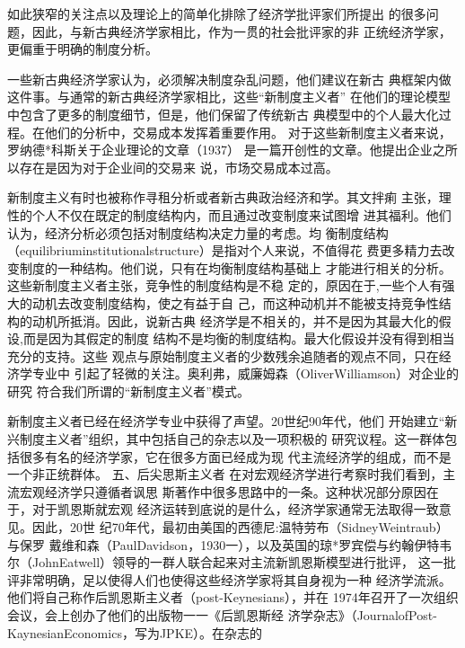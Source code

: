 如此狭窄的关注点以及理论上的简单化排除了经济学批评家们所提出
的很多问题，因此，与新古典经济学家相比，作为一贯的社会批评家的非
正统经济学家，更偏重于明确的制度分析。

一些新古典经济学家认为，必须解决制度杂乱问题，他们建议在新古
典框架内做这件事。与通常的新古典经济学家相比，这些“新制度主义者”
在他们的理论模型中包含了更多的制度细节，但是，他们保留了传统新古
典模型中的个人最大化过程。在他们的分析中，交易成本发挥着重要作用。
对于这些新制度主义者来说，罗纳德*科斯关于企业理论的文章（1937）
是一篇开创性的文章。他提出企业之所以存在是因为对于企业间的交易来
说，市场交易成本过高。



新制度主义有时也被称作寻租分析或者新古典政治经济和学。其文拌痢
主张，理性的个人不仅在既定的制度结构内，而且通过改变制度来试图增
进其福利。他们认为，经济分析必须包括对制度结构决定力量的考虑。均
衡制度结构（equilibriuminstitutionalstructure）是指对个人来说，不值得花
费更多精力去改变制度的一种结构。他们说，只有在均衡制度结构基础上
才能进行相关的分析。这些新制度主义者主张，竞争性的制度结构是不稳
定的，原因在于,一些个人有强大的动机去改变制度结构，使之有益于自
己，而这种动机并不能被支持竞争性结构的动机所抵消。因此，说新古典
经济学是不相关的，并不是因为其最大化的假设,而是因为其假定的制度
结构不是均衡的制度结构。最大化假设并没有得到相当充分的支持。这些
观点与原始制度主义者的少数残余追随者的观点不同，只在经济学专业中
引起了轻微的关注。奥利弗，威廉姆森（OliverWilliamson）对企业的研究
符合我们所谓的“新制度主义者”模式。

新制度主义者已经在经济学专业中获得了声望。20世纪90年代，他们
开始建立“新兴制度主义者”组织，其中包括自己的杂志以及一项积极的
研究议程。这一群体包括很多有名的经济学家，它在很多方面已经成为现
代主流经济学的组成，而不是一个非正统群体。
五、后尖思斯主义者
在对宏观经济学进行考察时我们看到，主流宏观经济学只遵循者讽思
斯著作中很多思路中的一条。这种状况部分原因在于，对于凯恩斯就宏观
经济运转到底说的是什么，经济学家通常无法取得一致意见。因此，20世
纪70年代，最初由美国的西德尼:温特劳布（SidneyWeintraub）与保罗
戴维和森（PaulDavidson，1930一），以及英国的琼*罗宾偿与约翰伊特韦
尔（JohnEatwell）领导的一群人联合起来对主流新凯恩斯模型进行批评，
这一批评非常明确，足以使得人们也使得这些经济学家将其自身视为一种
经济学流派。他们将自己称作后凯恩斯主义者（post-Keynesians），并在
1974年召开了一次组织会议，会上创办了他们的出版物一一《后凯恩斯经
济学杂志》（JournalofPost-KaynesianEconomics，写为JPKE）。在杂志的



